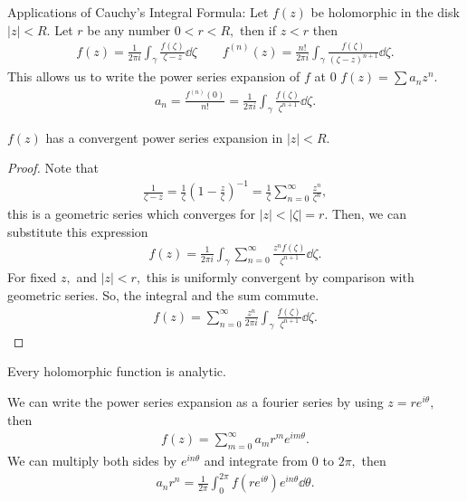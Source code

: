 \documentclass[a4paper,12pt]{article}
\begin{document}
Applications of Cauchy's Integral Formula: Let $f(z)$ be holomorphic in the disk $|z|<R.$ Let $r$ be any number $0<r<R,$ then if $z<r$ then \begin{align}
    f(z)=\frac{1}{2\pi i}\int_\gamma\frac{f(\zeta)}{\zeta-z}\dd\zeta\qquad f^{(n)}(z)=\frac{n!}{2\pi i}\int_\gamma\frac{f(\zeta)}{(\zeta-z)^{n+1}}\dd\zeta.
\end{align}
This allows us to write the power series expansion of $f$ at $0$ $f(z)=\sum a_nz^n.$ \begin{align}
    a_n=\frac{f^{(n)}(0)}{n!}=\frac{1}{2\pi i}\int_\gamma\frac{f(\zeta)}{\zeta^{n+1}}\dd\zeta.
\end{align}
\begin{theorem}
    $f(z)$ has a convergent power series expansion in $|z|<R.$
    \begin{proof}
        Note that \begin{align}
            \frac{1}{\zeta-z}=\frac{1}{\zeta}\left(1-\frac{z}{\zeta}\right)^{-1}=\frac{1}{\zeta}\sum_{n=0}^\infty\frac{z^n}{\zeta^n},
        \end{align}
        this is a geometric series which converges for $|z|<|\zeta|=r.$ Then, we can substitute this expression \begin{align}
            f(z)=\frac{1}{2\pi i}\int_\gamma\sum_{n=0}^\infty \frac{z^n f(\zeta)}{\zeta^{n+1}}\dd\zeta.
        \end{align}
        For fixed $z,$ and $|z|<r,$ this is uniformly convergent by comparison with geometric series. So, the integral and the sum commute.
        \begin{align}
            f(z)=\sum_{n=0}^\infty\frac{z^n}{2\pi i}\int_\gamma\frac{f(\zeta)}{\zeta^{n+1}}\dd\zeta.
        \end{align}
    \end{proof}
\end{theorem}
\begin{corollary}
    Every holomorphic function is analytic.
\end{corollary}
We can write the power series expansion as a fourier series by using $z=re^{i\theta},$ then \begin{align}
    f(z)=\sum_{m=0}^{\infty}a_mr^me^{im\theta}.
\end{align}
We can multiply both sides by $e^{in\theta}$ and integrate from $0$ to $2\pi,$ then \begin{align}
    a_nr^n=\frac{1}{2\pi}\int_0^{2\pi}f(re^{i\theta})e^{in\theta}\dd\theta.
\end{align}
\end{document}
